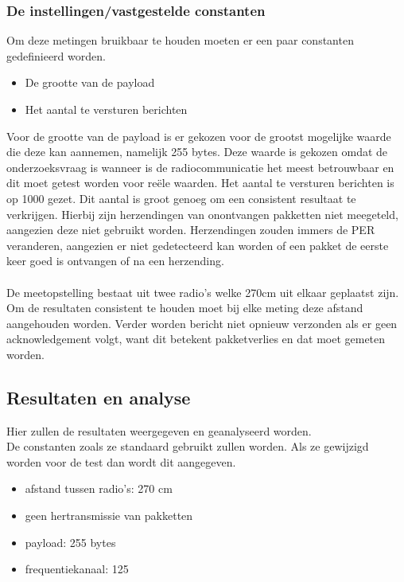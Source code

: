 \documentclass{article}
\begin{document}
\subsubsection{De instellingen/vastgestelde constanten}
Om deze metingen bruikbaar te houden moeten er een paar constanten gedefinieerd worden.
\begin{itemize}
	\item De grootte van de payload
	\item Het aantal te versturen berichten
\end{itemize}

Voor de grootte van de payload is er gekozen voor de grootst mogelijke waarde die deze kan aannemen, namelijk 255 bytes. Deze waarde is gekozen omdat de onderzoeksvraag is wanneer is de radiocommunicatie het meest betrouwbaar en dit moet getest worden voor re\"{e}le waarden. 
Het aantal te versturen berichten is op 1000 gezet. Dit aantal is groot genoeg om een consistent resultaat te verkrijgen. Hierbij zijn herzendingen van onontvangen pakketten niet meegeteld, aangezien deze niet gebruikt worden. Herzendingen zouden immers de PER veranderen, aangezien er niet gedetecteerd kan worden of een pakket de eerste keer goed is ontvangen of na een herzending.
\\
\\
De meetopstelling bestaat uit twee radio's welke 270cm uit elkaar geplaatst zijn. Om de resultaten consistent te houden moet bij elke meting deze afstand aangehouden worden. 
Verder worden bericht niet opnieuw verzonden als er geen acknowledgement volgt, want dit betekent pakketverlies en dat moet gemeten worden. 

\subsection{Resultaten en analyse}
Hier zullen de resultaten weergegeven en geanalyseerd worden. \\
  De constanten zoals ze standaard gebruikt zullen worden. Als ze gewijzigd worden voor de test dan wordt dit aangegeven. 
  \begin{itemize}
  	\item afstand tussen radio's: 270 cm
  	\item geen hertransmissie van pakketten
  	\item payload: 255 bytes
  	\item frequentiekanaal: 125
  \end{itemize}
  
\end{document}
